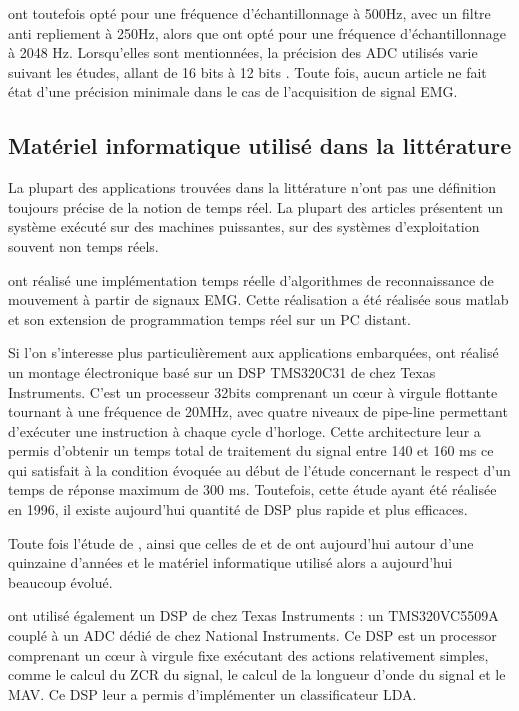 \documentclass[letterpaper, twoside, 12pt, memoire, creativecommons, hyperref]{thETS}
\begin{document}
\cite{Peleg2002} ont toutefois opté pour une fréquence d’échantillonnage à 500Hz, avec un filtre anti repliement à 250Hz, alors que \cite{Crawford2005} ont opté pour une fréquence d’échantillonnage à 2048 Hz.
Lorsqu’elles sont mentionnées, la précision des ADC utilisés varie suivant les études, allant de 16 bits \citep{Englehart2003} à 12 bits \citep{Tenore2007, Fukuda2003, Prasad1996}. Toute fois, aucun article ne fait état d'une précision minimale dans le cas de l'acquisition de signal EMG.


\subsection{Matériel informatique utilisé dans la littérature}

La plupart des applications trouvées dans la littérature n'ont pas une définition toujours précise de la notion de temps réel. La plupart des articles présentent un système exécuté sur des machines puissantes, sur des systèmes d'exploitation souvent non temps réels. 

\cite{Englehart2003} ont réalisé une implémentation temps réelle d’algorithmes de reconnaissance de mouvement à partir de signaux EMG. Cette réalisation a été réalisée sous matlab et son extension de programmation temps réel sur un PC distant.

Si l'on s'interesse plus particulièrement aux applications embarquées, \cite{Chang1996} ont réalisé un montage électronique basé sur un DSP TMS320C31 de chez Texas Instruments. C’est un processeur 32bits comprenant un cœur à virgule flottante tournant à une fréquence de 20MHz, avec quatre niveaux de pipe-line permettant d’exécuter une instruction à chaque cycle d’horloge. Cette architecture leur a permis d’obtenir un temps total de traitement du signal entre 140 et 160 ms ce qui satisfait à la condition évoquée au début de l’étude concernant le respect d’un temps de réponse maximum de 300 ms. Toutefois, cette étude ayant été réalisée en 1996, il existe aujourd’hui quantité de DSP plus rapide et plus efficaces.

Toute fois l'étude de \cite{Chang1996}, ainsi que celles de \cite{martinez1999} et de \cite{Prasad1996} ont aujourd'hui autour d'une quinzaine d'années et le matériel informatique utilisé alors a aujourd'hui beaucoup évolué.

\cite{Tenore2007} ont utilisé également un DSP de chez Texas Instruments : un TMS320VC5509A couplé à un ADC dédié de chez National Instruments. Ce DSP est un processor comprenant un cœur à virgule fixe exécutant des actions relativement simples, comme le calcul du ZCR du signal, le calcul de la longueur d’onde du signal et le MAV. Ce DSP leur a permis d'implémenter un classificateur LDA.
\end{document}
